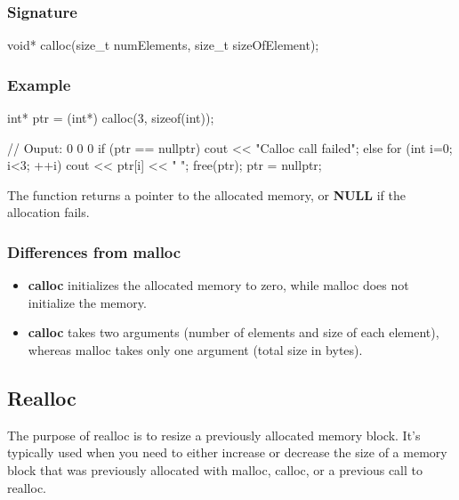 \documentclass{report}
\begin{document}
\begin{concept}
    \subsubsection{Signature}
    \bigbreak \noindent 
    \begin{cppcode}
        void* calloc(size_t numElements, size_t sizeOfElement);
    \end{cppcode}
    \bigbreak \noindent 
    \subsubsection{Example}
    \bigbreak \noindent 
    \begin{cppcode}
    int* ptr = (int*) calloc(3, sizeof(int));

    // Ouput: 0 0 0
    if (ptr == nullptr) { cout << "Calloc call failed";
    } else {
        for (int i=0; i<3; ++i)  {
            cout << ptr[i] << " ";
        }
    }
    free(ptr);
    ptr = nullptr;
    \end{cppcode}

    \bigbreak \noindent 
    The function returns a pointer to the allocated memory, or \textbf{NULL} if the allocation fails.
    \bigbreak \noindent 
    \subsubsection{Differences from malloc}
    \bigbreak \noindent 
    \begin{itemize}
        \item \textbf{calloc} initializes the allocated memory to zero, while malloc does not initialize the memory.
        \item \textbf{calloc} takes two arguments (number of elements and size of each element), whereas malloc takes only one argument (total size in bytes).
    \end{itemize}

    \bigbreak \noindent 
    \subsection{Realloc}
    \bigbreak \noindent 
    \begin{concept}
       The purpose of realloc is to resize a previously allocated memory block. It's typically used when you need to either increase or decrease the size of a memory block that was previously allocated with malloc, calloc, or a previous call to realloc. 
    \end{concept}
    \bigbreak \noindent 

\end{concept}
\end{document}
